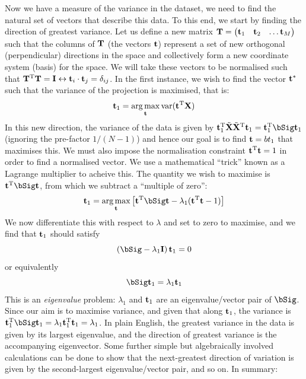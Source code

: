 \documentclass[12pt,a4paper]{tufte-handout}
\begin{document}
Now we have a measure of the variance in the dataset, we need to find the natural set of vectors that describe this data. To this end, we start by finding the direction of greatest variance. Let us define a new matrix $\mathbf{T}=\begin{pmatrix}\mathbf{t}_1 & \mathbf{t}_2 & \dots \mathbf{t}_M\end{pmatrix}$ such that the columns of $\mathbf{T}$ (the vectors $\mathbf{t}$) represent a set of new orthogonal (perpendicular) directions in the space and collectively form a new coordinate system (basis) for the space. We will take these vectors to be normalised such that $\mathbf{T}^{\mathrm{T}}\mathbf{T}=\mathbf{I}\leftrightarrow \mathbf{t}_i\cdot\mathbf{t}_j = \delta_{ij}$. In the first instance, we wish to find the vector $\mathbf{t}^*$ such that the variance of the projection is maximised, that is:
\begin{equation}
\mathbf{t}_1 =  \operatorname*{arg\,max}_{\mathbf{t}}\operatorname*{var}(\mathbf{t}^{\mathrm{T}}\mathbf{X})
\end{equation}
In this new direction, the variance of the data is given by $\bt_1^\rT\tilde\bX\tilde\bX^\rT\bt_1 = \bt_1^\rT\bSig\bt_1$ (ignoring the pre-factor $1/(N-1)$) and hence our goal is to find $\mathbf{t}=bt_1$ that maximises this. We must also impose the normalisation constraint $\mathbf{t}^{\mathrm{T}}\mathbf{t}=1$ in order to find a normalised vector. We use a mathematical ``trick'' known as a Lagrange multiplier to acheive this. The quantity we wish to maximise is $\bt^\rT\bSig\bt$, from which we subtract a ``multiple of zero'':
\begin{equation}
\bt_1 = \argmax _\bt \left[\bt^\rT\bSig\bt -\lambda_1(\bt^\rT\bt-1)\right]
\end{equation}
We now differentiate this with respect to $\lambda$ and set to zero to maximise, and we find that $\mathbf{t}_1$ should satisfy
\begin{equation}
  \left(\bSig-\lambda_1\bI\right)\bt_1 = 0
\end{equation}
or equivalently
\begin{equation}
  \bSig\bt_1 = \lambda_1\bt_1
\end{equation}
This is an \textit{eigenvalue} problem: $\lambda_1$ and $\mathbf{t}_1$ are an eigenvalue/vector pair of $\bSig$. Since our aim is to maximise variance, and given that along $\mathbf{t}_1$, the variance is $\bt_1^\rT\bSig\bt_1=\lambda_1\bt_1^\rT\bt_1 = \lambda_1$. In plain English, the greatest variance in the data is given by its largest eigenvalue, and the direction of greatest variance is the accompanying eigenvector. Some further simple but algebraically involved calculations can be done to show that the next-greatest direction of variation is given by the second-largest eigenvalue/vector pair, and so on. In summary:
\end{document}
